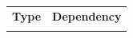 \documentclass{article}
\begin{document}
\begin{table}[ht]
\begin{tabular}{|p{}|p{}|}
                
            \end{tabular}
            \quad
            \begin{tabular}{|p{}|p{}|}
                \hline
                \textbf{Type} & \textbf{Dependency} \\ %
                \Xhline{2\arrayrulewidth}
                

\end{tabular}
\end{table}
\end{document}
